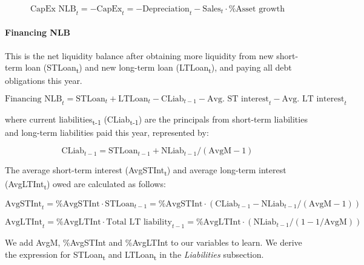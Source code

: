 \documentclass[12pt,a4paper]{article}
\begin{document}
\begin{equation}\label{eq:capex_nlb}
\text{CapEx NLB}_t = -\text{CapEx}_t = -\text{Depreciation}_t - \text{Sales}_t \cdot \text{\%Asset growth}
\end{equation}

\paragraph{Financing NLB}

This is the net liquidity balance after obtaining more liquidity from
new short-term loan (STLoan\textsubscript{t}) and new long-term loan
(LTLoan\textsubscript{t}), and paying all debt obligations this year.

\begin{equation}\label{eq:financing_nlb}
\text{Financing NLB}_t = \text{STLoan}_t + \text{LTLoan}_t - \text{CLiab}_{t-1} - \text{Avg.\ ST interest}_t - \text{Avg.\ LT interest}_t
\end{equation}

where current liabilities\textsubscript{t-1} (CLiab\textsubscript{t-1})
are the principals from short-term liabilities and long-term liabilities
paid this year, represented by:

\begin{equation}\label{eq:cliab_prev}
\text{CLiab}_{t-1} = \text{STLoan}_{t-1} + \text{NLiab}_{t-1} / (\text{AvgM} - 1)
\end{equation}

The average short-term interest (AvgSTInt\textsubscript{t}) and average
long-term interest (AvgLTInt\textsubscript{t}) owed are calculated as
follows:

\begin{equation}\label{eq:avg_st_interest}
\text{AvgSTInt}_t = \text{\%AvgSTInt} \cdot \text{STLoan}_{t-1} = \text{\%AvgSTInt} \cdot (\text{CLiab}_{t-1} - \text{NLiab}_{t-1} / (\text{AvgM} - 1))
\end{equation}

\begin{equation}\label{eq:avg_lt_interest}
\text{AvgLTInt}_t = \text{\%AvgLTInt} \cdot \text{Total LT liability}_{t-1} = \text{\%AvgLTInt} \cdot (\text{NLiab}_{t-1} / (1 - 1/\text{AvgM}))
\end{equation}

We add AvgM, \%AvgSTInt and \%AvgLTInt to our variables to learn. We
derive the expression for STLoan\textsubscript{t} and
LTLoan\textsubscript{t} in the \emph{Liabilities} subsection.
\end{document}
